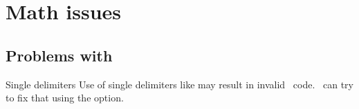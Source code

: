 \section{Math issues}

\subsection{Problems with \term{\mathml}}

\begin{issue}{Single delimiters}
  Use of single delimiters like \texcommand{$\langle$} may result in invalid
  \mathml\ code. \texfourht\ can try to fix that using the 
  option.
\end{issue}


